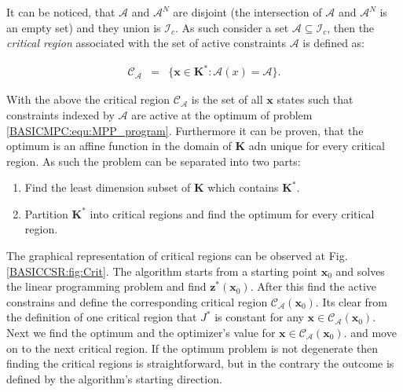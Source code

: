     It can be noticed, that $\mathcal{A}$ and $\mathcal{A}^N$ are disjoint (the intersection of $\mathcal{A}$ and $\mathcal{A}^N$ is an empty set) and they union is $\mathcal{I}_c$. As such consider a set $\mathcal{A}\subseteq\mathcal{I}_c$, then the \emph{critical region} associated with the set of active constraints $\mathcal{A}$ is defined as:

    \begin{equation}
    \begin{array}{rcl}
            \mathcal{C}_{\mathcal{A}}&=&\{\textbf{x}\in\textbf{K}^*:\mathcal{A}(x)=\mathcal{A}\}.
        \end{array}
        \label{BASICMPC:equ:MPP_stateset_optimal critical}
    \end{equation}

    With the above the critical region $\mathcal{C}_{\mathcal{A}}$ is the set of all $\textbf{x}$ states such that constraints indexed by $\mathcal{A}$ are active at the optimum of problem \ref{BASICMPC:equ:MPP_program}. Furthermore it can be proven, that the optimum is an affine function in the domain of $\textbf{K}$ adn unique for every critical region. As such the problem can be separated into two parts:

    \begin{enumerate}
    \item Find the least dimension subset of $\textbf{K}$ which contains $\textbf{K}^*$.
    \item Partition $\textbf{K}^*$ into critical regions and find the optimum for every critical region.
    \end{enumerate}

    The graphical representation of critical regions can be observed at Fig.\ref{BASICCSR:fig:Crit}. The algorithm starts from a starting point $\textbf{x}_0$ and solves the linear programming problem and find $\textbf{z}^*(\textbf{x}_0)$. After this find the active constrains and define the corresponding critical region $\mathcal{C}_{\mathcal{A}}(\textbf{x}_0)$. Its clear from the definition of one critical region that $J^*$ is constant for any $\textbf{x}\in\mathcal{C}_{\mathcal{A}}(\textbf{x}_0)$. Next  we find the optimum and the optimizer's value for $\textbf{x}\in\mathcal{C}_{\mathcal{A}}(\textbf{x}_0)$. and move on to the next critical region. If the optimum problem is not degenerate then finding the critical regions is straightforward, but in the contrary the outcome is defined by the algorithm's starting direction.

